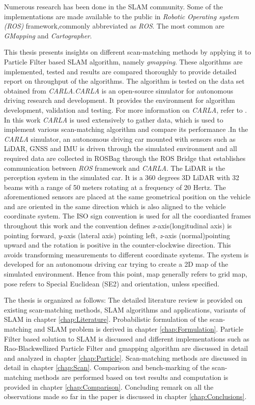 Numerous research has been done in the SLAM community. Some of the implementations are made available to the public in \textit{Robotic Operating system (ROS)} framework,commonly abbreviated as \textit{ROS}. The most common are \textit{GMapping}\cite{gmap_ros} and \textit{Cartographer}\cite{cartographer_ros}.

This thesis presents insights on different scan-matching methods by applying it to Particle Filter based SLAM algorithm, namely \textit{gmapping}. These algorithms are implemented, tested and results are compared thoroughly to provide detailed report on throughput of the algorithms. The algorithm is tested on the data set obtained from \textit{CARLA}\cite{Dosovitskiy17}.\textit{CARLA} is an open-source simulator for autonomous driving research and development. It provides the environment for algorithm development, validation and testing. For more information on \textit{CARLA}, refer to \cite{Dosovitskiy17}. In this work  \textit{CARLA} is used extensively to gather data, which is used to implement various scan-matching algorithm and compare its performance .In the \textit{CARLA} simulator, an autonomous driving car mounted with sensors such as LiDAR, GNSS and IMU is driven through the simulated environment and all required data are collected in ROSBag through the ROS Bridge that establishes communication between  \textit{ROS} framework and \textit{CARLA}. The LiDAR is the perception system in the simulated car. It is a 360 degrees 3D LiDAR with 32 beams with a range of 50 meters rotating at a  frequency of 20 Hertz. The aforementioned sensors are placed at the same geometrical position on the vehicle and are oriented in the same direction which is also aligned to the vehicle coordinate system. The ISO sign convention is used for all the coordianted frames throughout this work and the convention defines  \textit{x}-axis(longitudinal axis) is pointing forward,  \textit{y}-axis (lateral axis) pointing left,  \textit{z}-axis (normal)pointing upward and the rotation is positive in the counter-clockwise direction. This avoids transforming measurements to different coordinate systems. The system is developed for an autonomous driving car trying to create a 2D map of the simulated environment. Hence from this point, map generally refers to grid map, pose refers to Special Euclidean (SE2) and orientation, unless specified. 

 The thesis is organized as follows: The detailed literature review is provided on existing scan-matching methods, SLAM algorithms and applications, variants of SLAM in chapter \ref{chap:Literature}. Probabilistic formulation of the scan-matching and SLAM problem is derived in chapter \ref{chap:Formulation}. Particle Filter based solution to SLAM is discussed and different implementations such as Rao-Blackwellized Particle Filter and gmapping algorithm are discussed in detail and analyzed in chapter \ref{chap:Particle}. Scan-matching methods are discussed in detail in chapter \ref{chap:Scan}. Comparison and bench-marking of the scan-matching methods are performed based on test results and computation is provided in chapter \ref{chap:Comparison}. Concluding remark on all the observations made so far in the paper is discussed in chapter \ref{chap:Conclusions}.